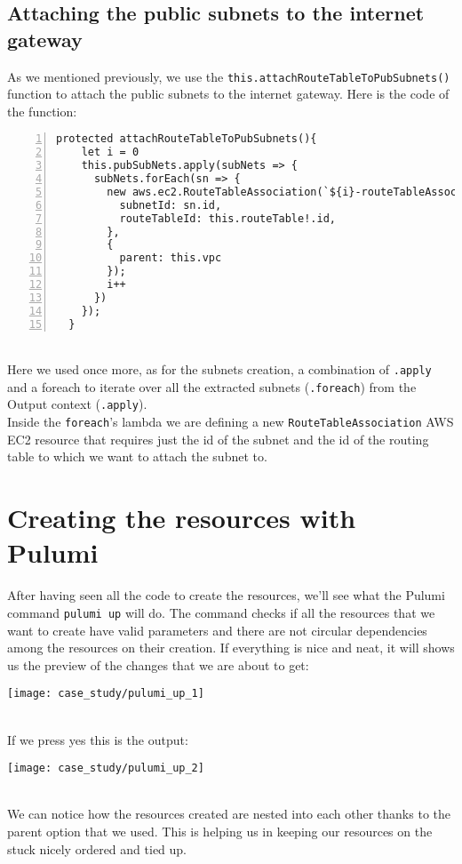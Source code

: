 \subsection{Attaching the public subnets to the internet gateway}
As we mentioned previously, we use the \texttt{this.attachRouteTableToPubSubnets()} function to attach the public subnets to the internet gateway.
Here is the code of the function:
\begin{lstlisting}[numbers=left, numberstyle=\tiny, numbersep=-5pt, stepnumber=1]
  protected attachRouteTableToPubSubnets(){
    let i = 0
    this.pubSubNets.apply(subNets => {
      subNets.forEach(sn => {
        new aws.ec2.RouteTableAssociation(`${i}-routeTableAssociation-typescript`, {
          subnetId: sn.id,
          routeTableId: this.routeTable!.id,
        },
        {
          parent: this.vpc
        });
        i++
      })
    });
  }
\end{lstlisting}\mbox{}\\
Here we used once more, as for the subnets creation, a combination of \texttt{.apply} and a foreach to iterate over all the extracted subnets (\texttt{.foreach}) from the Output context (\texttt{.apply}).\\
Inside the \texttt{foreach}'s lambda we are defining a new \texttt{RouteTableAssociation} AWS EC2 resource that requires just the id of the subnet and the id of the routing table to which we want to attach the subnet to.

\section{Creating the resources with Pulumi}
After having seen all the code to create the resources, we'll see what the Pulumi command \texttt{pulumi up} will do.
The command checks if all the resources that we want to create have valid parameters and there are not circular dependencies among the resources on their creation.
If everything is nice and neat, it will shows us the preview of the changes that we are about to get:
\begin{center}
  \texttt{[image: case\_study/pulumi\_up\_1]} 
\end{center}\mbox{}\\

If we press yes this is the output:
\begin{center}
  \texttt{[image: case\_study/pulumi\_up\_2]} 
\end{center}\mbox{}\\
We can notice how the resources created are nested into each other thanks to the parent option that we used.
This is helping us in keeping our resources on the stuck nicely ordered and tied up.\\


